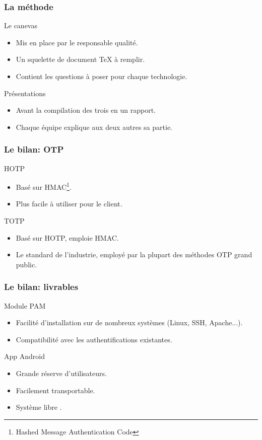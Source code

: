 \documentclass[xcolor=table]{beamer}
\begin{document}
\begin{frame}
\frametitle{La méthode}
\begin{block}{Le canevas}
\begin{itemize}
\item Mis en place par le responsable qualité.
\item Un squelette de document TeX à remplir.
\item Contient les questions à poser pour chaque technologie.
\end{itemize}
\end{block}
\begin{block}{Présentations}
\begin{itemize}
\item Avant la compilation des trois en un rapport.
\item Chaque équipe explique aux deux autres sa partie.
\end{itemize}
\end{block}
\end{frame}

\begin{frame}
\frametitle{Le bilan: OTP}
\begin{block}{HOTP}
\begin{itemize}
\item Basé sur HMAC\footnote{Hashed Message Authentication Code}.
\item Plus facile à utiliser pour le client.
\end{itemize}
\end{block}

\begin{block}{TOTP}
\begin{itemize}
\item Basé sur HOTP, emploie HMAC.
\item Le standard de l'industrie, employé par la plupart des méthodes OTP grand public.
\end{itemize}

\end{block}
\end{frame}


\begin{frame}
\frametitle{Le bilan: livrables}
\begin{block}{Module PAM}
\begin{itemize}
\item Facilité d'installation sur de nombreux systèmes (Linux, SSH, Apache...).
\item Compatibilité avec les authentifications existantes.
\end{itemize}
\end{block}

\begin{block}{App Android}
\begin{itemize}
\item Grande réserve d'utilisateurs.
\item Facilement transportable.
\item Système \og libre \fg{}. 
\end{itemize}
\end{block} 
\end{frame}
\end{document}
